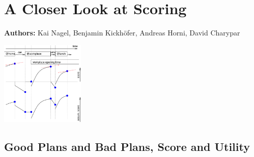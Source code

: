 \chapter{A Closer Look at Scoring}
\label{ch:scoring}

\hfill \textbf{Authors:} Kai Nagel, Benjamin Kickhöfer, Andreas Horni, David Charypar

\begin{center} \includegraphics[width=0.3\textwidth, angle=0]{using/figures/scoring-example} \end{center}



\section{Good Plans and Bad Plans, Score and Utility}
\label{sec:goodbadplans}





